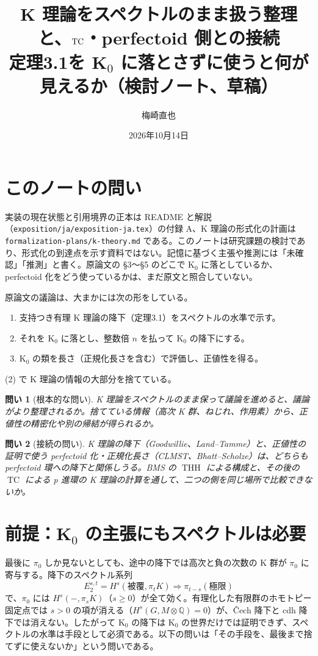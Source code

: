 \documentclass[11pt,a4paper]{ltjsarticle}
\title{K 理論をスペクトルのまま扱う整理と、$\TC$・perfectoid 側との接続\\[2pt]\large 定理3.1を K$_0$ に落とさずに使うと何が見えるか（検討ノート、草稿）}
\author{梅崎直也}
\date{2026年10月14日}
\theoremstyle{plain}
\newtheorem{question}{問い}
\theoremstyle{definition}
\theoremstyle{remark}
\newcommand{\Q}{\mathbb{Q}}
\newcommand{\THH}{\operatorname{THH}}
\newcommand{\TC}{\operatorname{TC}}
\begin{document}
\maketitle

\section*{このノートの問い}

実装の現在状態と引用境界の正本は README と解説（\texttt{exposition/ja/exposition-ja.tex}）の付録 A、K 理論の形式化の計画は \texttt{formalization-plans/k-theory.md} である。このノートは研究課題の検討であり、形式化の到達点を示す資料ではない。記憶に基づく主張や推測には「未確認」「推測」と書く。原論文の §3〜§5 のどこで K$_0$ に落としているか、perfectoid 化をどう使っているかは、まだ原文と照合していない。

原論文の議論は、大まかには次の形をしている。
\begin{enumerate}[label=(\arabic*)]
  \item 支持つき有理 K 理論の降下（定理3.1）をスペクトルの水準で示す。
  \item それを K$_0$ に落とし、整数倍 $n$ を払って K$_0$ の降下にする。
  \item K$_0$ の類を長さ（正規化長さを含む）で評価し、正値性を得る。
\end{enumerate}
(2) で K 理論の情報の大部分を捨てている。
\begin{question}[根本的な問い]
K 理論をスペクトルのまま保って議論を進めると、議論がより整理されるか。捨てている情報（高次 K 群、ねじれ、作用素）から、正値性の精密化や別の帰結が得られるか。
\end{question}
\begin{question}[接続の問い]
K 理論の降下（Goodwillie、Land--Tamme）と、正値性の証明で使う perfectoid 化・正規化長さ（CLMST、Bhatt--Scholze）は、どちらも perfectoid 環への降下と関係しうる。BMS の $\THH$ による構成と、その後の $\TC$ による p 進環の K 理論の計算を通して、二つの側を同じ場所で比較できないか。
\end{question}

\section{前提：K$_0$ の主張にもスペクトルは必要}

最後に $\pi_0$ しか見ないとしても、途中の降下では高次と負の次数の K 群が $\pi_0$ に寄与する。降下のスペクトル系列
\[
  E_2^{s,t} = H^s(\text{被覆}, \pi_t K) \Longrightarrow \pi_{t-s}(\text{極限})
\]
で、$\pi_0$ には $H^s(-, \pi_s K)$（$s \ge 0$）が全て効く。有理化した有限群のホモトピー固定点では $s>0$ の項が消える（$H^s(G, M\otimes\Q)=0$）が、Čech 降下と cdh 降下では消えない。したがって K$_0$ の降下は K$_0$ の世界だけでは証明できず、スペクトルの水準は手段として必須である。以下の問いは「その手段を、最後まで捨てずに使えないか」という問いである。
\end{document}
